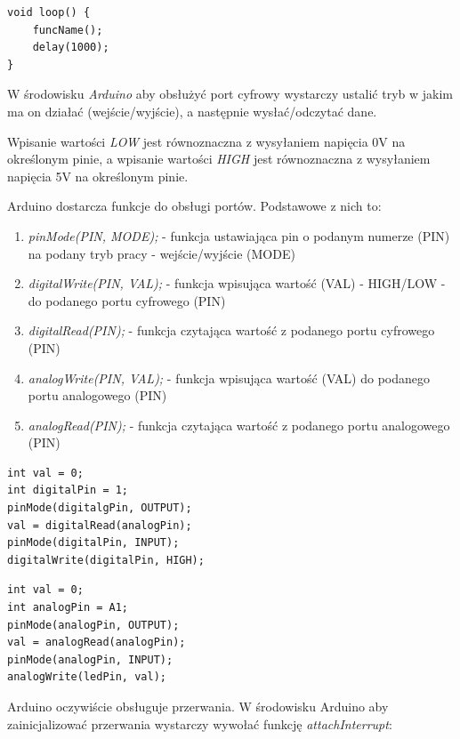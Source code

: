 \documentclass{xmgr}
\begin{document}
\begin{lstlisting}[label=bot-dirs-alg,caption=Odpytywanie funkcji w nieskończonej pętli w środowisku Arduino]
void loop() {
	funcName();
	delay(1000);
}
\end{lstlisting}

W środowisku \emph{Arduino} aby obsłużyć port cyfrowy wystarczy ustalić tryb w jakim ma on działać (wejście/wyjście), a następnie wysłać/odczytać dane.

Wpisanie wartości \emph{LOW} jest równoznaczna z wysyłaniem napięcia 0V na określonym pinie, a wpisanie wartości \emph{HIGH} jest równoznaczna z wysyłaniem napięcia 5V na określonym pinie.

Arduino dostarcza funkcje do obsługi portów. Podstawowe z nich to:

\begin{enumerate}
	\item \emph{pinMode(PIN, MODE);} - funkcja ustawiająca pin o podanym numerze (PIN) na podany tryb pracy - wejście/wyjście (MODE)
	\item \emph{digitalWrite(PIN, VAL);} - funkcja wpisująca wartość (VAL) - HIGH/LOW - do podanego portu cyfrowego (PIN)
	\item \emph{digitalRead(PIN);} - funkcja czytająca wartość z podanego portu cyfrowego (PIN)
	\item \emph{analogWrite(PIN, VAL);} - funkcja wpisująca wartość (VAL) do podanego portu analogowego (PIN)
	\item \emph{analogRead(PIN);}  - funkcja czytająca wartość z podanego portu analogowego (PIN)
\end{enumerate}

\begin{lstlisting}[label=bot-dirs-alg,caption=Obsługa portu cyfrowego w środowisku Arduino]
int val = 0;
int digitalPin = 1;	
pinMode(digitalgPin, OUTPUT);
val = digitalRead(analogPin);
pinMode(digitalPin, INPUT);
digitalWrite(digitalPin, HIGH);
\end{lstlisting}

\begin{lstlisting}[label=bot-dirs-alg,caption=Obsługa portu analogowego w środowisku Arduino]
int val = 0;
int analogPin = A1;	
pinMode(analogPin, OUTPUT);
val = analogRead(analogPin);
pinMode(analogPin, INPUT);
analogWrite(ledPin, val);
\end{lstlisting}

Arduino oczywiście obsługuje przerwania. W środowisku Arduino aby zainicjalizować przerwania wystarczy wywołać funkcję \emph{attachInterrupt}:
\end{document}
